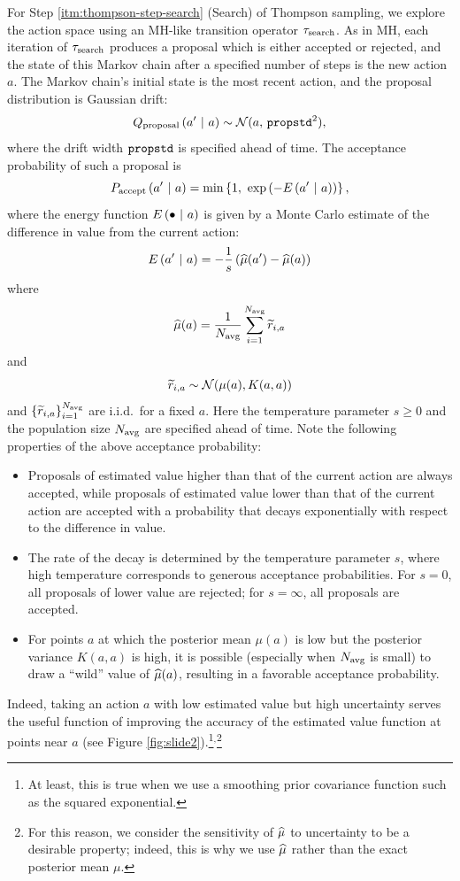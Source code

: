 For Step \ref{itm:thompson-step-search} (Search) of Thompson sampling, we
explore the action space using an MH-like transition operator $\tau_{\textrm{search}}$.
As in MH, each iteration of $\tau_{\textrm{search}}$ produces a proposal which is either
accepted or rejected, and the state of this Markov chain after a specified
number of steps is the new action $a$.  The Markov chain's initial state is the
most recent action, and the proposal distribution is Gaussian drift:
\[ Q_{\textrm{proposal}}\left( a' \ \middle\vert\  a \right) \sim \mathcal{N}(a,\,\texttt{propstd}^2), \]
where the drift width $\texttt{propstd}$ is specified ahead of time.  The acceptance
probability of such a proposal is
\[ P_\accept\pn{a' \mvert a} = \min\br{1,\ \exp\pn{-E\pn{a' \mvert a}}}, \]
where the energy function $E\left( \bullet \ \middle\vert\  a \right)$ is given by a Monte Carlo
estimate of the difference in value from the current action:
\[ E\left( a' \ \middle\vert\  a \right) = -\frac1s \left( \widehat{\mu}(a') - \widehat{\mu}(a) \right) \]
where
\[ \widehat{\mu}(a) = \frac{1}{N_{\textrm{avg}}} \sum_{i=1}^{N_{\textrm{avg}}} \widetilde{r}_{i,a} \]
and
\[ \widetilde{r}_{i,a} \sim \mathcal{N}(\mu(a), K(a,a)) \]
and $\left\{ \widetilde{r}_{i,a} \right\}_{i=1}^{N_{\textrm{avg}}}$ are i.i.d.\ for a fixed $a$.
Here the temperature parameter $s \geq 0$ and the population size $N_{\textrm{avg}}$ are
specified ahead of time.  Note the following properties of the above acceptance
probability:
\begin{itemize}
  \item Proposals of estimated value higher than that of the current action are
    always accepted, while proposals of estimated value lower than that of the
    current action are accepted with a probability that decays exponentially
    with respect to the difference in value.
  \item The rate of the decay is determined by the temperature parameter $s$,
    where high temperature corresponds to generous acceptance probabilities.
    For $s=0$, all proposals of lower value are rejected; for $s=\infty$, all
    proposals are accepted.
  \item For points $a$ at which the posterior mean $\mu(a)$ is low but the
    posterior variance $K(a,a)$ is high, it is possible (especially when
    $N_{\textrm{avg}}$ is small) to draw a ``wild'' value of $\widehat{\mu}(a)$, resulting in a
    favorable acceptance probability.
\end{itemize}
Indeed, taking an action $a$ with low estimated value but high uncertainty
serves the useful function of improving the accuracy of the estimated value
function at points near $a$ (see Figure \ref{fig:slide2}).\footnote{
  At least, this is true when we use a smoothing prior covariance function such
  as the squared exponential.
}$^,$\footnote{
  For this reason, we consider the sensitivity of $\widehat{\mu}$ to uncertainty to be
  a desirable property; indeed, this is why we use $\widehat{\mu}$ rather than the
  exact posterior mean $\mu$.
}
